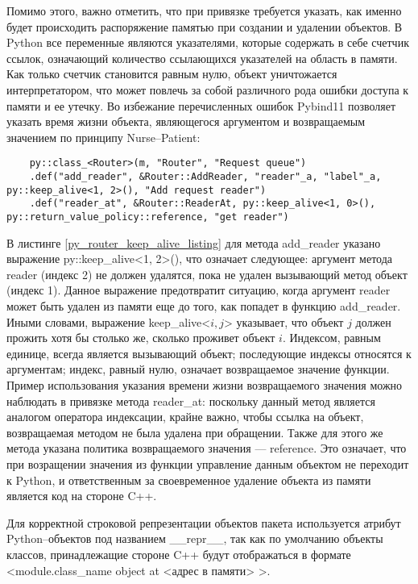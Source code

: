  Помимо этого, важно отметить, что при привязке требуется указать, как именно будет происходить распоряжение памятью при создании и удалении объектов. В Python все переменные являются указателями, которые содержать в себе счетчик ссылок, означающий количество ссылающихся указателей на область в памяти. Как только счетчик становится равным нулю, объект уничтожается интерпретатором, что может повлечь за собой различного рода ошибки доступа к памяти и ее утечку. Во избежание перечисленных ошибок Pybind11 позволяет указать время жизни объекта, являющегося аргументом и возвращаемым значением по принципу Nurse--Patient:
 
 \begin{lstlisting}
 	py::class_<Router>(m, "Router", "Request queue")
 	.def("add_reader", &Router::AddReader, "reader"_a, "label"_a, py::keep_alive<1, 2>(), "Add request reader")
 	.def("reader_at", &Router::ReaderAt, py::keep_alive<1, 0>(), py::return_value_policy::reference, "get reader")
 \end{lstlisting}

В листинге \ref{py_router_keep_alive_listing} для метода add\_reader указано выражение py::keep\_alive<1, 2>(), что означает следующее: аргумент метода reader (индекс 2) не должен удалятся, пока не удален вызывающий метод объект (индекс 1). Данное выражение предотвратит ситуацию, когда аргумент reader может быть удален из памяти еще до того, как попадет в функцию add\_reader. Иными словами, выражение keep\_alive<$i,j$> указывает, что объект $j$ должен прожить хотя бы столько же, сколько проживет объект $i$. Индексом, равным единице, всегда является вызывающий объект; последующие индексы относятся к аргументам; индекс, равный нулю, означает возвращаемое значение функции. Пример использования указания времени жизни возвращаемого значения можно наблюдать в привязке метода reader\_at: поскольку данный метод является аналогом оператора индексации, крайне важно, чтобы ссылка на объект, возвращаемая методом не была удалена при обращении. Также для этого же метода указана политика возвращаемого значения --- reference. Это означает, что при возращении значения из функции управление данным объектом не переходит к Python, и ответственным за своевременное удаление объекта из памяти является код на стороне C++.

Для корректной строковой репрезентации объектов пакета используется атрибут Python--объектов под названием \_\_repr\_\_, так как по умолчанию объекты классов, принадлежащие стороне C++ будут отображаться в формате\\ <module.class\_name object at <адрес в памяти> >.

